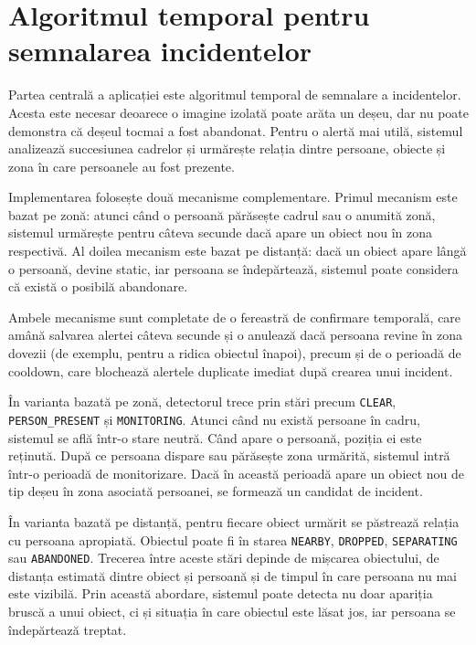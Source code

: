 \section{Algoritmul temporal pentru semnalarea incidentelor}

Partea centrală a aplicației este algoritmul temporal de semnalare a incidentelor. Acesta este necesar deoarece o imagine izolată poate arăta un deșeu, dar nu poate demonstra că deșeul tocmai a fost abandonat. Pentru o alertă mai utilă, sistemul analizează succesiunea cadrelor și urmărește relația dintre persoane, obiecte și zona în care persoanele au fost prezente.

Implementarea folosește două mecanisme complementare. Primul mecanism este bazat pe zonă: atunci când o persoană părăsește cadrul sau o anumită zonă, sistemul urmărește pentru câteva secunde dacă apare un obiect nou în zona respectivă. Al doilea mecanism este bazat pe distanță: dacă un obiect apare lângă o persoană, devine static, iar persoana se îndepărtează, sistemul poate considera că există o posibilă abandonare.

Ambele mecanisme sunt completate de o fereastră de confirmare temporală, care amână salvarea alertei câteva secunde și o anulează dacă persoana revine în zona dovezii (de exemplu, pentru a ridica obiectul înapoi), precum și de o perioadă de cooldown, care blochează alertele duplicate imediat după crearea unui incident.

În varianta bazată pe zonă, detectorul trece prin stări precum \texttt{CLEAR}, \texttt{PERSON\_PRESENT} și \texttt{MONITORING}. Atunci când nu există persoane în cadru, sistemul se află într-o stare neutră. Când apare o persoană, poziția ei este reținută. După ce persoana dispare sau părăsește zona urmărită, sistemul intră într-o perioadă de monitorizare. Dacă în această perioadă apare un obiect nou de tip deșeu în zona asociată persoanei, se formează un candidat de incident.

În varianta bazată pe distanță, pentru fiecare obiect urmărit se păstrează relația cu persoana apropiată. Obiectul poate fi în starea \texttt{NEARBY}, \texttt{DROPPED}, \texttt{SEPARATING} sau \texttt{ABANDONED}. Trecerea între aceste stări depinde de mișcarea obiectului, de distanța estimată dintre obiect și persoană și de timpul în care persoana nu mai este vizibilă. Prin această abordare, sistemul poate detecta nu doar apariția bruscă a unui obiect, ci și situația în care obiectul este lăsat jos, iar persoana se îndepărtează treptat.

